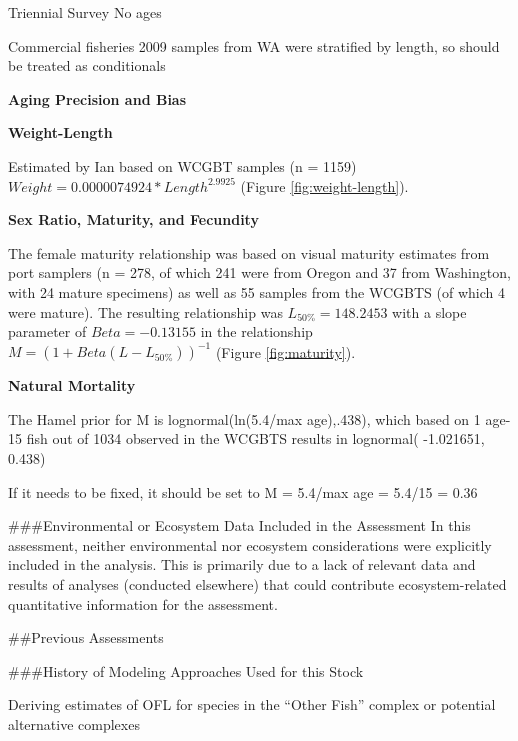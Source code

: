 \documentclass[12pt,]{article}
\begin{document}
Triennial Survey No ages

Commercial fisheries 2009 samples from WA were stratified by length, so
should be treated as conditionals

\vspace{.5cm}

\textbf{Aging Precision and Bias}

\vspace{.5cm}

\textbf{Weight-Length}

Estimated by Ian based on WCGBT samples (n = 1159)
\(Weight = 0.0000074924 * Length ^ 2.9925\) (Figure
\ref{fig:weight-length}).

\vspace{.5cm}

\textbf{Sex Ratio, Maturity, and Fecundity}

The female maturity relationship was based on visual maturity estimates
from port samplers (n = 278, of which 241 were from Oregon and 37 from
Washington, with 24 mature specimens) as well as 55 samples from the
WCGBTS (of which 4 were mature). The resulting relationship was
\(L_{50\%} = 148.2453\) with a slope parameter of \(Beta = -0.13155\) in
the relationship \(M = (1 + Beta(L - L_{50\%}))^{-1}\) (Figure
\ref{fig:maturity}).

\vspace{.5cm}

\textbf{Natural Mortality}

The Hamel prior for M is lognormal(ln(5.4/max age),.438), which based on
1 age-15 fish out of 1034 observed in the WCGBTS results in lognormal(
-1.021651, 0.438)

If it needs to be fixed, it should be set to M = 5.4/max age = 5.4/15 =
0.36

\vspace{.5cm}

\#\#\#Environmental or Ecosystem Data Included in the Assessment In this
assessment, neither environmental nor ecosystem considerations were
explicitly included in the analysis. This is primarily due to a lack of
relevant data and results of analyses (conducted elsewhere) that could
contribute ecosystem-related quantitative information for the
assessment.

\newpage

\#\#Previous Assessments

\#\#\#History of Modeling Approaches Used for this Stock

Deriving estimates of OFL for species in the ``Other Fish'' complex or
potential alternative complexes
\end{document}
